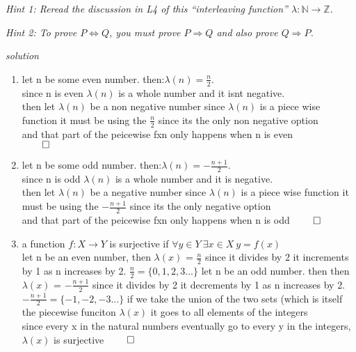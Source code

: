 \documentclass[11pt,twoside]{amsart}
\begin{document}
            
 \noindent \textit{Hint 1: Reread the discussion in \textnormal{\textsf{L4}} of this ``interleaving function'' $\lambda: \mathbb{N} \rightarrow \mathbb{Z}$.}

 \noindent \textit{Hint 2: To prove $P \Leftrightarrow Q$, you must prove $P \Rightarrow Q$ and also prove $Q \Rightarrow P$.}


\emph{solution}

 \begin{enumerate}[1)]
  \item
    let n be some even number.
    then:$\lambda(n) = \frac{n}{2}$. \\
    since n is even $\lambda(n)$ is a whole number and it isnt negative. \\ 
    \bigskip
    then let $\lambda(n)$ be a non negative number
    since $\lambda(n)$ is a piece wise function it must be using the $\frac{n}{2}$ since its the only non negative option \\
    and that part of the peicewise fxn only happens when n is even\\
    $\qed$
    \bigskip
  \item
    let n be some odd number.
    then:$\lambda(n) = -\frac{n+1}{2}$. \\
    since n is odd $\lambda(n)$ is a whole number and     it is negative.\\
    \bigskip
    then let $\lambda(n)$ be a negative number since $\lambda(n)$ is a piece wise function it must
     be using the $-\frac{n+1}{2}$ since its the only negative option \\
    and that part of the peicewise fxn only happens when n is odd
    $\qed$

    \newpage
  \item
    a function $f: X \rightarrow Y$ is surjective if 
    $\forall y \in Y \ \exists x \in X \ y = f(x)$\\
    let n be an even number, then $\lambda(x)$ = $\frac{n}{2}$ since it divides by 2 it increments by 1 as n increases by 2. $\frac{n}{2} = \{0,1,2,3...\}$
    let n be an odd number. then then $\lambda(x)$ = $-\frac{n+1}{2}$ since it divides by 2 it decrements by 1 as n increases by 2. $-\frac{n+1}{2} = \{-1,-2,-3...\}$
if we take the union of the two sets (which is itself the piecewise funciton $\lambda(x)$ it goes to all elements of the integers\\
since every x in the natural numbers eventually go to every y in the integers, $\lambda(x)$ is surjective
$\qed$


\end{enumerate}
\end{document}
